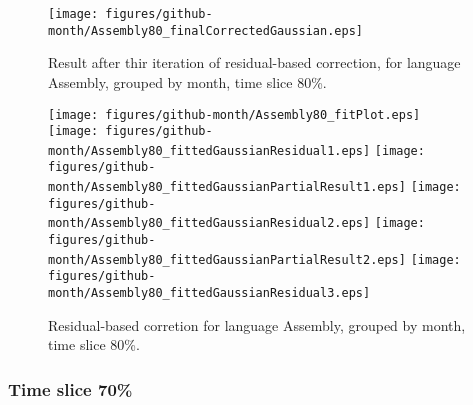\begin{figure}[]
\centering
{\texttt{[image: figures/github-month/Assembly80\_finalCorrectedGaussian.eps]}}
\caption{Result after thir iteration of residual-based correction, for language Assembly, grouped by month, time slice 80\%.}
\end{figure}


\begin{figure}[hb]
\centering
{}
{\texttt{[image: figures/github-month/Assembly80\_fitPlot.eps]}}
{\texttt{[image: figures/github-month/Assembly80\_fittedGaussianResidual1.eps]}}
{\texttt{[image: figures/github-month/Assembly80\_fittedGaussianPartialResult1.eps]}}
{\texttt{[image: figures/github-month/Assembly80\_fittedGaussianResidual2.eps]}}
{\texttt{[image: figures/github-month/Assembly80\_fittedGaussianPartialResult2.eps]}}
{\texttt{[image: figures/github-month/Assembly80\_fittedGaussianResidual3.eps]}}
\caption{Residual-based corretion for language Assembly, grouped by month, time slice 80\%.}
\end{figure}


\clearpage 
\newpage 


\FloatBarrier

\subsubsection{Time slice 70\%}

